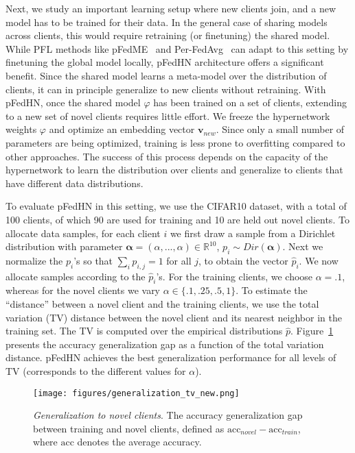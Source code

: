 \documentclass{article}
\newcommand{\bv}{\boldsymbol{v}}
\newcommand\ourmethod{pFedHN}
\begin{document}
Next, we study an important learning setup where
new clients join, and a new model has to be trained for their data. In the general case of sharing models across clients, this would require retraining (or finetuning) the shared model. While PFL methods like pFedME~\cite{Dinh2020PersonalizedFL} and Per-FedAvg~\cite{Fallah2020PersonalizedFL} can adapt to this setting by finetuning the global model locally, \ourmethod{} architecture offers a significant benefit. Since the shared model learns a meta-model over the distribution of clients, it can in principle generalize to new clients without retraining. 
With \ourmethod{}, once the shared model $\varphi$ has been trained on a set of clients, extending to a new set of novel clients requires little effort. We freeze the hypernetwork weights $\varphi$ and optimize an embedding vector $\bv_{new}$.
Since only a small number of parameters are being optimized, training is less prone to overfitting compared to other approaches. The success of this process depends on the capacity of the hypernetwork to learn the distribution over clients and generalize to clients that have different data distributions. 

To evaluate \ourmethod{} in this setting, we use the CIFAR10 dataset, with a total of 100 clients, of which 90 are used for training and 10 are held out novel clients. To allocate data samples, for each client $i$ we first draw a sample from a Dirichlet distribution with parameter $\boldsymbol{\alpha}=(\alpha, ...,\alpha)\in \mathbb{R}^{10}$, $p_i\sim Dir(\boldsymbol{\alpha})$. Next we normalize the $p_i$'s so that $\sum_i p_{i,j}=1$ for all $j$, to obtain the vector $\hat{p}_i$. We now allocate samples according to the $\hat{p}_i$'s. For the training clients, we choose $\alpha=.1$, whereas for the novel clients we vary $\alpha\in\{.1, .25, .5, 1\}$. To estimate the ``distance'' between a novel client and the training clients, we use the total variation (TV) distance between the novel client and its nearest neighbor in the training set. The TV is computed over the empirical distributions $\hat{p}$. Figure~\ref{fig:gen} presents the accuracy generalization gap as a function of the total variation distance. \ourmethod{} achieves the best generalization performance for all levels of TV (corresponds to the different values for $\mathbb{\alpha}$).






\begin{figure}[ht]
    \centering
    \texttt{[image: figures/generalization\_tv\_new.png]}
    \caption{\textit{Generalization to novel clients}. The accuracy generalization gap between training and novel clients, defined as $\text{acc}_{novel} - \text{acc}_{train}$, where $\text{acc}$ denotes the average accuracy.}
    \label{fig:gen}
\end{figure}
\end{document}
